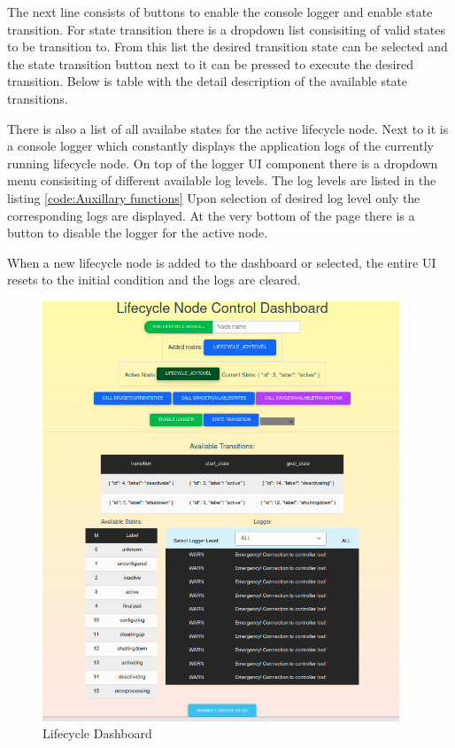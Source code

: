 The next line consists of buttons to enable the console logger and enable state transition. For state transition there is a dropdown list consisiting of valid states to be transition to. From this list the desired transition state can be selected and the state transition button next to it can be pressed to execute the desired transition.
Below is table with the detail description of the available state transitions. 

There is also a list of all availabe states for the active lifecycle node. Next to it is a console logger which constantly displays the application logs of the currently running lifecycle node. On top of the logger UI component there is a dropdown menu consisiting of different available log levels. The log levels are listed in the listing \ref{code:Auxillary functions} Upon selection of desired log level only the corresponding logs are displayed.  
At the very bottom of the page there is a button to disable the logger for the active node.

When a new lifecycle node is added to the dashboard or selected, the entire UI resets to the initial condition and the logs are cleared.
\begin{figure}[H]
	\centering
	\includegraphics[width=0.95\textwidth]{"Bilder/lifecycle-dashboard.png"}
	\caption{Lifecycle Dashboard}
	\label{fig:Implementation:LifecycleDashboard}					
\end{figure}

